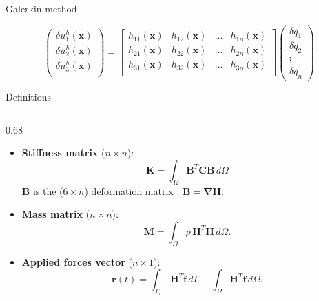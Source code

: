 \documentclass[aspectratio=169]{beamer}
\begin{document}
{{\begin{frame}{Galerkin method}
{\begin{block}{}
          $$
            \begin{pmatrix}
              \delta u_{1}^{h}(\mathbf x) \\
              \delta u_{2}^{h}(\mathbf x) \\
              \delta u_{3}^{h}(\mathbf x) \\
            \end{pmatrix}
            =
            \begin{bmatrix}
              h_{11}(\mathbf x) & h_{12}(\mathbf x) & \dots & h_{1n}(\mathbf x) \\
              h_{21}(\mathbf x) & h_{22}(\mathbf x) & \dots & h_{2n}(\mathbf x) \\
              h_{31}(\mathbf x) & h_{32}(\mathbf x) & \dots & h_{3n}(\mathbf x) \\
            \end{bmatrix}
            \begin{pmatrix}
              \delta  q_{1} \\
              \delta q_{2}  \\
              \vdots        \\
              \delta  q_{n}
            \end{pmatrix}
          $$
        \end{block}
      }
    \end{frame}

    \begin{frame}{Definitions}
      \begin{columns}[onlytextwidth]
        \begin{column}{0.68\textwidth}
          \begin{block}{}
            \begin{itemize}
              \item \textbf{Stiffness matrix} ($n\times n$):
                    \[
                      \mathbf K
                      = \int_\Omega \mathbf B^T \mathbf C \mathbf B\,d\Omega
                    \]
                    $\mathbf B$ is the ($6\times n$) deformation matrix : $\mathbf B=\boldsymbol{\nabla}\mathbf H$.

              \item \textbf{Mass matrix} ($n\times n$):
                    \[
                      \mathbf M
                      = \int_\Omega \rho\,\mathbf H^T\mathbf H\,d\Omega.
                    \]

              \item \textbf{Applied forces vector} ($n\times 1$):
                    \[
                      \mathbf r(t)
                      = \int_{\Gamma_\sigma}\mathbf H^T\mathbf{\hat f}\,d\Gamma
                      + \int_\Omega\mathbf H^T\mathbf f\,d\Omega.
                    \]
            \end{itemize}
          \end{block}
        \end{column}


\end{columns}
\end{frame}}}
\end{document}
